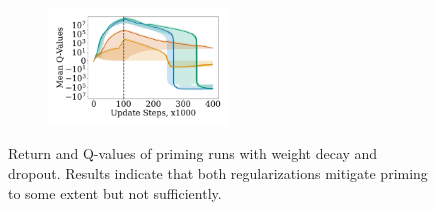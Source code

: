 \begin{figure}[t]
\begin{minipage}[b]{.62\textwidth}
\begin{subfigure}[b]{0.5\textwidth}
        \label{subfig:priming_abl_ret}
    \end{subfigure}%
    \begin{subfigure}[b]{0.5\textwidth}
    \centering
        \includegraphics[width=4.8cm, trim=1cm 1cm 1cm 1cm ,clip]{figures/dissecting/priming/priming_ablations_Q.pdf}
        \label{subfig:priming_abl_Q}
    \end{subfigure}%
    \vspace{-18pt}
    \caption{Return and
    Q-values of priming runs with weight decay and dropout. Results indicate that both regularizations mitigate priming to some extent but not sufficiently. }
    \label{fig:priming_abl}
\end{minipage}
    \vspace{-5pt}
\end{figure}


